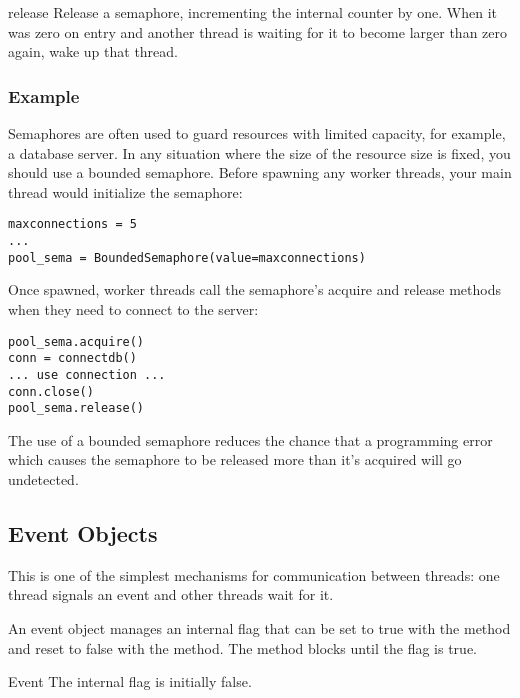 \begin{methoddesc}{release}{}
Release a semaphore,
incrementing the internal counter by one.  When it was zero on
entry and another thread is waiting for it to become larger
than zero again, wake up that thread.
\end{methoddesc}


\subsubsection{ Example \label{semaphore-examples}}

Semaphores are often used to guard resources with limited capacity, for
example, a database server.  In any situation where the size of the resource
size is fixed, you should use a bounded semaphore.  Before spawning any
worker threads, your main thread would initialize the semaphore:

\begin{verbatim}
maxconnections = 5
...
pool_sema = BoundedSemaphore(value=maxconnections)
\end{verbatim}

Once spawned, worker threads call the semaphore's acquire and release
methods when they need to connect to the server:

\begin{verbatim}
pool_sema.acquire()
conn = connectdb()
... use connection ...
conn.close()
pool_sema.release()
\end{verbatim}

The use of a bounded semaphore reduces the chance that a programming error
which causes the semaphore to be released more than it's acquired will go
undetected.


\subsection{Event Objects \label{event-objects}}

This is one of the simplest mechanisms for communication between
threads: one thread signals an event and other threads wait for it.

An event object manages an internal flag that can be set to true with
the  method and reset to false with the 
method.  The  method blocks until the flag is true.


\begin{classdesc}{Event}{}
The internal flag is initially false.
\end{classdesc}

